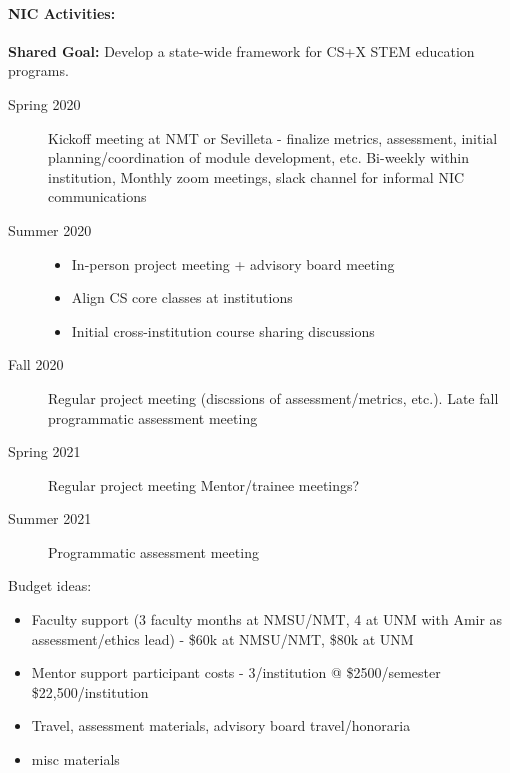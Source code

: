 \paragraph{NIC Activities:}
\textbf{Shared Goal:} Develop a state-wide framework for CS+X STEM education programs.
\begin{description}
    \item[Spring 2020] Kickoff meeting at NMT or Sevilleta - finalize metrics, assessment, initial planning/coordination of module development, etc. Bi-weekly within institution, Monthly zoom meetings, slack channel for informal NIC communications
    \item[Summer 2020] 
    \begin{itemize}
        \item In-person project meeting + advisory board meeting
        \item Align CS core classes at institutions 
        \item Initial cross-institution course sharing discussions
    \end{itemize}
    \item[Fall 2020] Regular project meeting (discssions of assessment/metrics, etc.). Late fall programmatic assessment meeting
    \item[Spring 2021] Regular project meeting Mentor/trainee meetings?
    \item[Summer 2021] Programmatic assessment meeting
\end{description}

Budget ideas:
\begin{itemize}
    \item Faculty support (3 faculty months at NMSU/NMT, 4 at UNM with Amir as assessment/ethics lead) - \$60k at NMSU/NMT, \$80k at UNM
    \item Mentor support participant costs - 3/institution @ \$2500/semester \$22,500/institution
    \item Travel, assessment materials, advisory board travel/honoraria
    \item misc materials
\end{itemize}
